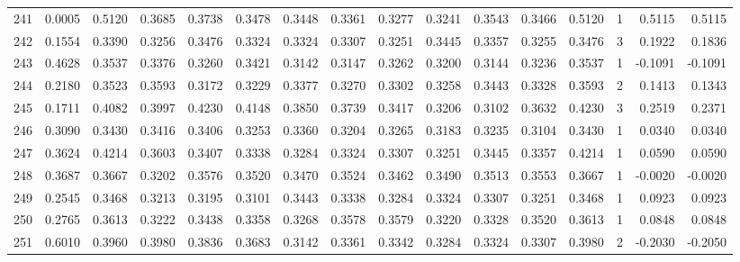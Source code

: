 \begin{tabular}{lrrrrrrrrrrrrrrr}
241 &      0.0005 &  0.5120 &  0.3685 &  0.3738 &  0.3478 &  0.3448 &  0.3361 &  0.3277 &  0.3241 &  0.3543 &   0.3466 &     0.5120 &      1 &                    0.5115 &                     0.5115 \\
242 &      0.1554 &  0.3390 &  0.3256 &  0.3476 &  0.3324 &  0.3324 &  0.3307 &  0.3251 &  0.3445 &  0.3357 &   0.3255 &     0.3476 &      3 &                    0.1922 &                     0.1836 \\
243 &      0.4628 &  0.3537 &  0.3376 &  0.3260 &  0.3421 &  0.3142 &  0.3147 &  0.3262 &  0.3200 &  0.3144 &   0.3236 &     0.3537 &      1 &                   -0.1091 &                    -0.1091 \\
244 &      0.2180 &  0.3523 &  0.3593 &  0.3172 &  0.3229 &  0.3377 &  0.3270 &  0.3302 &  0.3258 &  0.3443 &   0.3328 &     0.3593 &      2 &                    0.1413 &                     0.1343 \\
245 &      0.1711 &  0.4082 &  0.3997 &  0.4230 &  0.4148 &  0.3850 &  0.3739 &  0.3417 &  0.3206 &  0.3102 &   0.3632 &     0.4230 &      3 &                    0.2519 &                     0.2371 \\
246 &      0.3090 &  0.3430 &  0.3416 &  0.3406 &  0.3253 &  0.3360 &  0.3204 &  0.3265 &  0.3183 &  0.3235 &   0.3104 &     0.3430 &      1 &                    0.0340 &                     0.0340 \\
247 &      0.3624 &  0.4214 &  0.3603 &  0.3407 &  0.3338 &  0.3284 &  0.3324 &  0.3307 &  0.3251 &  0.3445 &   0.3357 &     0.4214 &      1 &                    0.0590 &                     0.0590 \\
248 &      0.3687 &  0.3667 &  0.3202 &  0.3576 &  0.3520 &  0.3470 &  0.3524 &  0.3462 &  0.3490 &  0.3513 &   0.3553 &     0.3667 &      1 &                   -0.0020 &                    -0.0020 \\
249 &      0.2545 &  0.3468 &  0.3213 &  0.3195 &  0.3101 &  0.3443 &  0.3338 &  0.3284 &  0.3324 &  0.3307 &   0.3251 &     0.3468 &      1 &                    0.0923 &                     0.0923 \\
250 &      0.2765 &  0.3613 &  0.3222 &  0.3438 &  0.3358 &  0.3268 &  0.3578 &  0.3579 &  0.3220 &  0.3328 &   0.3520 &     0.3613 &      1 &                    0.0848 &                     0.0848 \\
251 &      0.6010 &  0.3960 &  0.3980 &  0.3836 &  0.3683 &  0.3142 &  0.3361 &  0.3342 &  0.3284 &  0.3324 &   0.3307 &     0.3980 &      2 &                   -0.2030 &                    -0.2050 \\

\end{tabular}
